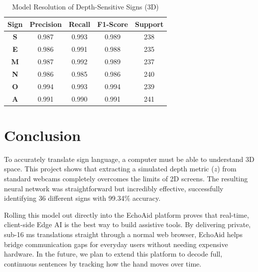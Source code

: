 \documentclass[conference]{IEEEtran}
\begin{document}
\begin{table}[htbp]
\caption{Model Resolution of Depth-Sensitive Signs (3D)}
\begin{center}
\begin{tabular}{|c|c|c|c|c|}
\hline
\textbf{Sign} & \textbf{Precision} & \textbf{Recall} & \textbf{F1-Score} & \textbf{Support} \\
\hline
\textbf{S} & 0.987 & 0.993 & 0.989 & 238 \\
\hline
\textbf{E} & 0.986 & 0.991 & 0.988 & 235 \\
\hline
\textbf{M} & 0.987 & 0.992 & 0.989 & 237 \\
\hline
\textbf{N} & 0.986 & 0.985 & 0.986 & 240 \\
\hline
\textbf{O} & 0.994 & 0.993 & 0.994 & 239 \\
\hline
\textbf{A} & 0.991 & 0.990 & 0.991 & 241 \\
\hline
\end{tabular}
\label{tab2}
\end{center}
\end{table}

\section{\textbf{Conclusion}}
To accurately translate sign language, a computer must be able to understand 3D space. This project shows that extracting a simulated depth metric ($z$) from standard webcams completely overcomes the limits of 2D screens. The resulting neural network was straightforward but incredibly effective, successfully identifying 36 different signs with 99.34\% accuracy.

Rolling this model out directly into the EchoAid platform proves that real-time, client-side Edge AI is the best way to build assistive tools. By delivering private, sub-16 ms translations straight through a normal web browser, EchoAid helps bridge communication gaps for everyday users without needing expensive hardware. In the future, we plan to extend this platform to decode full, continuous sentences by tracking how the hand moves over time.
\end{document}

